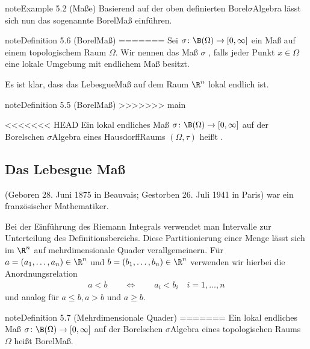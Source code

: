 \documentclass[letterpaper,10pt,english]{jupyterBook}
\begin{document}
\begin{sphinxadmonition}{note}{Example 5.2 (Maße)}
\sphinxAtStartPar
Basierend auf der oben definierten Borel\sphinxhyphen{}\(\sigma\)\sphinxhyphen{}Algebra lässt sich nun das sogenannte Borel\sphinxhyphen{}Maß einführen.
\label{masstheorie/masstheorie:definition-10}
\begin{sphinxadmonition}{note}{Definition 5.6 (Borel\sphinxhyphen{}Maß)}
=======
Sei \(\sigma \colon \B(\Omega) \rightarrow [0, \infty]\) ein Maß auf einem topologischem Raum \(\Omega\).
Wir nennen das Maß \(\sigma\) , falls jeder Punkt \(x \in \Omega\) eine lokale Umgebung mit endlichem Maß besitzt.
\end{sphinxadmonition}

\sphinxAtStartPar
Es ist klar, dass das Lebesgue\sphinxhyphen{}Maß auf dem Raum \(\R^n\) lokal endlich ist.
\label{masstheorie/masstheorie:definition-5}
\begin{sphinxadmonition}{note}{Definition 5.5 (Borel\sphinxhyphen{}Maß)}
>>>>>>> main



\sphinxAtStartPar
<<<<<<< HEAD
Ein lokal endliches Maß \(\sigma \colon \B(\Omega) \rightarrow [0, \infty]\) auf der Borelschen \(\sigma\)\sphinxhyphen{}Algebra eines Hausdorff\sphinxhyphen{}Raums \((\Omega,\tau)\) heißt .
\end{sphinxadmonition}


\subsection{Das Lebesgue Maß}
\label{\detokenize{masstheorie/masstheorie:das-lebesgue-masz}}
\begin{sphinxShadowBox}

\sphinxAtStartPar
{} (Geboren 28. Juni 1875 in Beauvais; Gestorben 26. Juli 1941 in Paris) war ein französischer Mathematiker.
\end{sphinxShadowBox}

\sphinxAtStartPar
Bei der Einführung des Riemann Integrals verwendet man Intervalle zur Unterteilung des Definitionsbereichs.
Diese Partitionierung einer Menge lässt sich im \(\R^n\) auf mehrdimensionale Quader verallgemeinern. Für \(a = (a_1,\ldots,a_n) \in \R^n\) und \(b = (b_1,\ldots,b_n) \in \R^n\) verwenden wir hierbei die Anordnungsrelation
\begin{equation*}
\begin{split}a < b \qquad \Leftrightarrow \qquad a_i < b_i \quad i=1,\ldots,n\end{split}
\end{equation*}
\sphinxAtStartPar
und analog für \(a \leq b, a > b\) und \(a \geq b\).
\label{masstheorie/masstheorie:def:quader}
\begin{sphinxadmonition}{note}{Definition 5.7 (Mehrdimensionale Quader)}
=======
Ein lokal endliches Maß \(\sigma \colon \B(\Omega) \rightarrow [0, \infty]\) auf der Borelschen \(\sigma\)\sphinxhyphen{}Algebra eines topologischen Raums \(\Omega\) heißt Borel\sphinxhyphen{}Maß.
\end{sphinxadmonition}



\end{sphinxadmonition}
\end{document}
